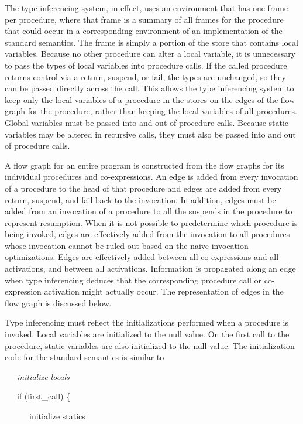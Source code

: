 The type inferencing system, in effect, uses an environment that has
one frame per procedure, where that frame is a summary of all frames
for the procedure that could occur in a corresponding environment of
an implementation of the standard semantics. The frame is simply a
portion of the store that contains local variables. Because no other
procedure can alter a local variable, it is unnecessary to pass the
types of local variables into procedure calls. If the called procedure
returns control via a return, suspend, or fail, the types are
unchanged, so they can be passed directly across the call. This allows
the type inferencing system to keep only the local variables of a
procedure in the stores on the edges of the flow graph for the
procedure, rather than keeping the local variables of all procedures.
Global variables must be passed into and out of procedure
calls. Because static variables may be altered in recursive calls,
they must also be passed into and out of procedure calls.

A flow graph for an entire program is constructed from the flow graphs
for its individual procedures and co-expressions.  An edge is added
from every invocation of a procedure to the head of that procedure and
edges are added from every return, suspend, and fail back to the
invocation. In addition, edges must be added from an invocation of a
procedure to all the suspends in the procedure to represent
resumption. When it is not possible to predetermine which procedure is
being invoked, edges are effectively added from the invocation to all
procedures whose invocation cannot be ruled out based on the naive
invocation optimizations. Edges are effectively added between all
co-expressions and all activations, and between all
activations. Information is propagated along an edge when type
inferencing deduces that the corresponding procedure call or
co-expression activation might actually occur. The representation of
edges in the flow graph is discussed below.

Type inferencing must reflect the initializations performed when a
procedure is invoked. Local variables are initialized to the null
value. On the first call to the procedure, static variables are also
initialized to the null value. The initialization code for the
standard semantics is similar to

{\ttfamily\mdseries
\ \ \ \textit{initialize locals}}

{\ttfamily\mdseries
\ \ \ if (first\_call) \{}

{\ttfamily\mdseries
\ \ \ \ \ \ initialize statics}

